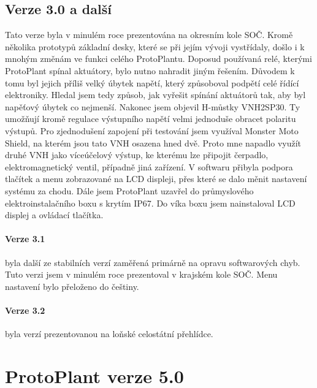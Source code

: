 \subsection{Verze 3.0 a další}
Tato verze byla v minulém roce prezentována na okresním kole SOČ.
Kromě několika prototypů základní desky, které se při jejím vývoji vystřídaly, došlo i k mnohým změnám ve funkci celého ProtoPlantu.
Doposud používaná relé, kterými ProtoPlant spínal aktuátory, bylo nutno nahradit jiným řešením.
Důvodem k tomu byl jejich příliš velký úbytek napětí, který způsoboval podpětí celé řídící elektroniky.
Hledal jsem tedy způsob, jak vyřešit spínání aktuátorů tak, aby byl napěťový úbytek co nejmenší.
Nakonec jsem objevil H-můstky VNH2SP30. 
Ty umožňují kromě regulace výstupního napětí velmi jednoduše obracet polaritu výstupů.
Pro zjednodušení zapojení při testování jsem využíval Monster Moto Shield, na kterém jsou tato VNH osazena hned dvě.
Proto mne napadlo využít druhé VNH jako víceúčelový výstup, ke kterému lze připojit čerpadlo, elektromagnetický ventil, případně jiná zařízení.
V softwaru přibyla podpora tlačítek a menu zobrazované na LCD displeji, přes které se dalo měnit nastavení systému za chodu.
Dále jsem ProtoPlant uzavřel do průmyslového elektroinstalačního boxu s krytím IP67.
Do víka boxu jsem nainstaloval LCD displej a ovládací tlačítka.

\paragraph{Verze 3.1}
byla další ze stabilních verzí zaměřená primárně na opravu softwarových chyb.
Tuto verzi jsem v minulém roce prezentoval v krajském kole SOČ.
Menu nastavení bylo přeloženo do češtiny.

\paragraph{Verze 3.2}
byla verzí prezentovanou na loňské celostátní přehlídce.

\section{ProtoPlant verze 5.0}


\newpage